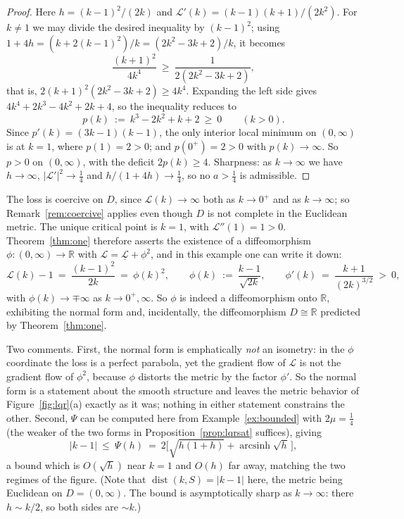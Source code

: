 \documentclass[11pt]{article}
\theoremstyle{plain}
\theoremstyle{definition}
\theoremstyle{remark}
\newcommand{\R}{\mathbb{R}}
\DeclareMathOperator{\dist}{dist}
\begin{document}
\begin{proof}
Here $h = (k-1)^2/(2k)$ and $\mathcal{L}'(k) = (k-1)(k+1)/(2k^2)$. For $k\ne1$ we
may divide the desired inequality by $(k-1)^2$; using
$1+4h = (k+2(k-1)^2)/k = (2k^2-3k+2)/k$, it becomes
\[
  \frac{(k+1)^2}{4k^4} \ \ge\ \frac{1}{2(2k^2-3k+2)} ,
\]
that is, $2(k+1)^2(2k^2-3k+2)\ge 4k^4$. Expanding the left side gives
$4k^4 + 2k^3 - 4k^2 + 2k + 4$, so the inequality reduces to
\[
  p(k) \ :=\ k^3-2k^2+k+2 \ \ge\ 0 \qquad (k>0) .
\]
Since $p'(k) = (3k-1)(k-1)$, the only interior local minimum on $(0,\infty)$ is at
$k=1$, where $p(1)=2>0$; and $p(0^+)=2>0$ with $p(k)\to\infty$. So $p>0$ on
$(0,\infty)$, with the deficit $2p(k)\ge4$. Sharpness: as $k\to\infty$ we have
$h\to\infty$, $|\mathcal{L}'|^2\to\tfrac14$ and $h/(1+4h)\to\tfrac14$, so no
$a>\tfrac14$ is admissible.
\end{proof}

The loss is coercive on $D$, since $\mathcal{L}(k)\to\infty$ both as $k\to0^+$
and as $k\to\infty$; so Remark~\ref{rem:coercive} applies even though $D$ is not
complete in the Euclidean metric. The unique critical point is $k=1$, with
$\mathcal{L}''(1)=1>0$. Theorem~\ref{thm:one} therefore asserts the existence of
a diffeomorphism $\phi\colon(0,\infty)\to\R$ with
$\mathcal{L}=\underline{\mathcal{L}}+\phi^2$, and in this example one can write it
down:
\[
  \mathcal{L}(k) - 1 \ =\ \frac{(k-1)^2}{2k} \ =\ \phi(k)^2 ,
  \qquad \phi(k) \ :=\ \frac{k-1}{\sqrt{2k}} ,
  \qquad \phi'(k) \ =\ \frac{k+1}{(2k)^{3/2}} \ >\ 0 ,
\]
with $\phi(k)\to\mp\infty$ as $k\to0^+,\infty$. So $\phi$ is indeed a
diffeomorphism onto $\R$, exhibiting the normal form and, incidentally, the
diffeomorphism $D\cong\R$ predicted by Theorem~\ref{thm:one}.

Two comments. First, the normal form is emphatically \emph{not} an isometry: in
the $\phi$ coordinate the loss is a perfect parabola, yet the gradient flow of
$\mathcal{L}$ is not the gradient flow of $\phi^2$, because $\phi$ distorts the
metric by the factor $\phi'$. So the normal form is a statement about the smooth
structure and leaves the metric behavior of Figure~\ref{fig:lqr}(a) exactly as it
was; nothing in either statement constrains the other. Second, $\Psi$ can be computed here from
Example~\ref{ex:bounded} with $2\mu=\tfrac14$ (the weaker of the two forms in
Proposition~\ref{prop:lqrsat} suffices), giving
\[
  |k-1| \ \le\ \Psi(h) \ =\ 2\bigl[\sqrt{h(1+h)}+\operatorname{arcsinh}\sqrt h\,\bigr] ,
\]
a bound which is $O(\sqrt h)$ near $k=1$ and $O(h)$ far away, matching the two
regimes of the figure. (Note that $\dist(k,S)=|k-1|$ here, the metric being
Euclidean on $D=(0,\infty)$. The bound is asymptotically sharp as $k\to\infty$:
there $h\sim k/2$, so both sides are $\sim k$.)
\end{document}
